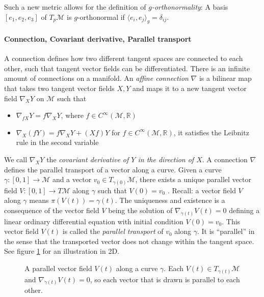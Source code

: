 \documentclass[../thesis.tex]{subfiles}
\begin{document}
Such a new metric allows for the definition of \emph{$g$-orthonormality}:
A basis $[e_1, e_2, e_3]$ of $T_p\mathcal{M}$ is $g$-orthonormal if $\langle e_i, e_j \rangle_g = \delta_{ij}$.

\paragraph{Connection, Covariant derivative, Parallel transport}
A connection defines how two different tangent spaces are connected to each other, such that tangent vector fields
can be differentiated. There is an infinite amount of connections on a manifold.
An \emph{affine connection} $\nabla$ is a bilinear map that takes two tangent vector fields $X,Y$ and maps it
to a new tangent vector field $\nabla_XY$ on $\mathcal{M}$ such that
\begin{itemize}
  \item $\nabla_{fX}Y = f \nabla_XY$, where $f\in C^{\infty}(\mathcal{M}, \mathbb{R})$
  \item $\nabla_X(fY) = f\nabla_XY + (Xf)Y$ for $f\in C^{\infty}(\mathcal{M}, \mathbb{R})$, it satisfies the Leibnitz rule in the second variable
\end{itemize}
We call $\nabla_XY$ the \emph{covariant derivative of $Y$ in the direction of $X$}.
A connection $\nabla$ defines the parallel transport
of a vector along a curve. Given a curve $\gamma: [0,1] \to \mathcal{M}$ and
a vector $v_0 \in T_{\gamma(0)}\mathcal{M}$, there exists a unique parallel vector field $V: [0,1] \to T\mathcal{M}$ along $\gamma$
such that $V(0) = v_0$ \cite{LeeCurvature}.
Recall: a vector field $V$ along $\gamma$ means $\pi(V(t))=\gamma(t)$.
The uniqueness and existence is a consequence of the vector field $V$ being the solution
of $\nabla_{\dot{\gamma}(t)}V(t) = 0$ defining a linear ordinary differential equation with initial condition
$V(0)=v_0$. This vector field $V(t)$ is called the \emph{parallel transport} of $v_0$ along $\gamma$.
It is ``parallel'' in the sense that the transported vector does not change within the tangent space.
See figure \ref{fig:vectorfield} for an illustration in 2D.
\begin{figure}[htb]
  \centering
  \def\svgwidth{20em}
  
  \caption{A parallel vector field $V(t)$ along a curve $\gamma$. Each $V(t)\in T_{\gamma(t)}\mathcal{M}$ and
  $\nabla_{\dot{\gamma}(t)}V(t) = 0$, so each vector that is drawn is parallel to each other.}
  \label{fig:vectorfield}
\end{figure}
 
\end{document}
